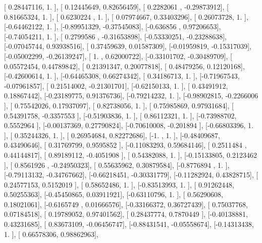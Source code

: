 \documentclass{article}
\begin{document}
       [ 0.28447116,  1.        ],
       [ 0.12445649,  0.82656459],
       [ 0.2282061 , -0.29873912],
       [ 0.81665324,  1.        ],
       [ 0.6230224 ,  1.        ],
       [ 0.07974667,  0.33403296],
       [ 0.26073728,  1.        ],
       [-0.64462122,  1.        ],
       [-0.89951329, -0.37545083],
       [-0.636856  ,  0.97206653],
       [-0.74054211,  1.        ],
       [ 0.2799586 , -0.31653898],
       [-0.53330251, -0.23288638],
       [-0.07045744,  0.93938516],
       [ 0.37459639,  0.01587309],
       [-0.01959819, -0.15317039],
       [-0.05002299, -0.26139247],
       [ 1.        ,  0.62000722],
       [-0.33101702, -0.30489709],
       [ 0.05572454,  0.44789842],
       [ 0.21391347,  0.20077818],
       [ 0.48479256,  0.12120168],
       [-0.42600614,  1.        ],
       [-0.64465308,  0.66274342],
       [ 0.34186713,  1.        ],
       [-0.71967543, -0.07961857],
       [ 0.21514002, -0.21301701],
       [-0.62150133,  1.        ],
       [ 0.43491912,  0.18867442],
       [-0.23189775,  0.91376736],
       [-0.79214232,  1.        ],
       [-0.98902815, -0.2266006 ],
       [ 0.75542026,  0.17937097],
       [ 0.82738056,  1.        ],
       [ 0.75985869,  0.97931684],
       [ 0.54391758, -0.3357553 ],
       [-0.51903836,  1.        ],
       [ 0.86112321,  1.        ],
       [-0.73988702,  0.5552964 ],
       [-0.00137369,  0.27790824],
       [-0.70610008, -0.201894  ],
       [-0.66803396,  1.        ],
       [ 0.35244326,  1.        ],
       [ 0.26954684,  0.82272686],
       [-1.        ,  1.        ],
       [-0.48409687,  0.43490646],
       [ 0.31769799,  0.9595852 ],
       [-0.11083293,  0.59684146],
       [ 0.2511484 ,  0.44144817],
       [ 0.89189112, -0.4051908 ],
       [ 0.54382088,  1.        ],
       [-0.15133805,  0.2123462 ],
       [ 0.8561926 , -0.24950323],
       [ 0.55635962,  0.30879584],
       [-0.8776894 ,  1.        ],
       [-0.79113132, -0.34767662],
       [-0.66218451, -0.30331779],
       [-0.11282924,  0.43828715],
       [ 0.24577153,  0.5152019 ],
       [ 0.58652486,  1.        ],
       [-0.83513993,  1.        ],
       [ 0.91262448,  0.50255363],
       [-0.45450865,  0.03911921],
       [-0.63110796,  1.        ],
       [ 0.56290608,  0.18021061],
       [-0.6165749 ,  0.01666576],
       [-0.33166372,  0.36727439],
       [ 0.75037768,  0.07184518],
       [ 0.19789052,  0.97401562],
       [ 0.28437774,  0.7870449 ],
       [-0.40138881,  0.43231685],
       [ 0.83673109, -0.06456747],
       [-0.88431541, -0.05558674],
       [-0.14313438,  1.        ],
       [ 0.66578306,  0.98862963],
\end{document}
